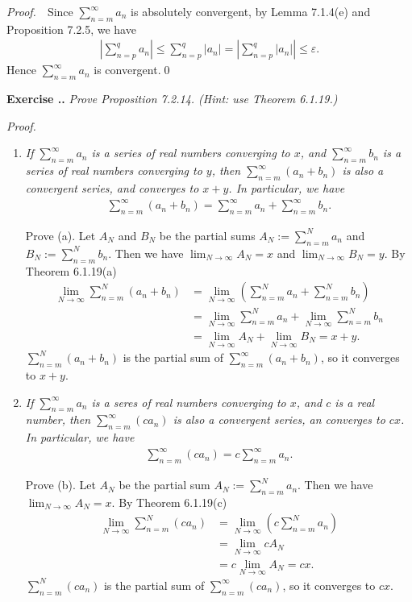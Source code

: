 \documentclass{book}
\newcommand{\pff}{\vspace{.25em}\noindent\emph{Proof.}~~}
\newcounter{Exercise}[section]
\renewcommand{\theExercise}{\thesection.\arabic{Exercise}.}
\newcommand{\new}{\vspace{1.5em}\noindent\textbf{{Exercise \stepcounter{Exercise}\textbf{\theExercise}}} }
\begin{document}
\pff Since $\sum_{n=m}^\infty a_n$ is absolutely convergent, by Lemma 7.1.4(e) and Proposition 7.2.5, we have
    \begin{align*}
        \left|\sum_{n=p}^q a_n\right|\leq\sum_{n=p}^q|a_n|=\left|\sum_{n=p}^q|a_n|\right|\leq\varepsilon.
    \end{align*}
Hence $\sum_{n=m}^\infty a_n$ is convergent.\qed

\new\emph{Prove Proposition 7.2.14. (Hint: use Theorem 6.1.19.)}

\pff
\begin{enumerate}
    \item \emph{If $\sum_{n=m}^{\infty}a_n$ is a series of real numbers converging to $x$, and $\sum_{n=m}^{\infty}b_n$ is a series of real numbers converging to $y$, then $\sum_{n=m}^{\infty}(a_n+b_n)$ is also a convergent series, and converges to $x+y$. In particular, we have}
    \begin{align*}
        \sum_{n=m}^{\infty}(a_n+b_n)=\sum_{n=m}^{\infty}a_n+\sum_{n=m}^{\infty}b_n.
    \end{align*}

    Prove (a). Let $A_N$ and $B_N$ be the partial sums $A_N:=\sum_{n=m}^{N}a_n$ and $B_N:=\sum_{n=m}^{N}b_n$. Then we have $\lim_{N\to\infty}A_N=x$ and $\lim_{N\to\infty}B_N=y$. By Theorem 6.1.19(a)
    \begin{align*}
        \lim_{N\to\infty}\sum_{n=m}^{N}(a_n+b_n)
        &=\lim_{N\to\infty}\left(\sum_{n=m}^{N}a_n+\sum_{n=m}^{N}b_n\right)\\
        &=\lim_{N\to\infty}\sum_{n=m}^{N}a_n+\lim_{N\to\infty}\sum_{n=m}^{N}b_n\\
        &=\lim_{N\to\infty}A_N+\lim_{N\to\infty}B_N=x+y.
    \end{align*}
    $\sum_{n=m}^{N}(a_n+b_n)$ is the partial sum of $\sum_{n=m}^{\infty}(a_n+b_n)$, so it converges to $x+y$.

    \item \emph{If $\sum_{n=m}^{\infty}a_n$ is a seres of real numbers converging to $x$, and $c$ is a real number, then $\sum_{n=m}^{\infty}(ca_n)$ is also a convergent series, an converges to $cx$. In particular, we have}
    \begin{align*}
        \sum_{n=m}^{\infty}(ca_n)=c\sum_{n=m}^{\infty}a_n.
    \end{align*}

    Prove (b). Let $A_N$ be the partial sum $A_N:=\sum_{n=m}^{N}a_n$. Then we have $\lim_{N\to\infty}A_N=x$. By Theorem 6.1.19(c)
    \begin{align*}
        \lim_{N\to\infty}\sum_{n=m}^{N}(ca_n)
        &=\lim_{N\to\infty}\left(c\sum_{n=m}^{N}a_n\right)\\
        &=\lim_{N\to\infty}cA_N\\
        &=c\lim_{N\to\infty}A_N=cx.
    \end{align*}
    $\sum_{n=m}^{N}(ca_n)$ is the partial sum of $\sum_{n=m}^{\infty}(ca_n)$, so it converges to $cx$.


\end{enumerate}
\end{document}
